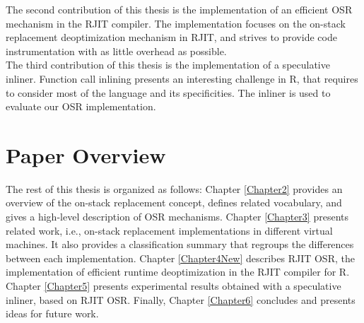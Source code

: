 The second contribution of this thesis is the implementation of an efficient OSR mechanism in the RJIT compiler. The implementation focuses on the on-stack replacement deoptimization mechanism in RJIT, and strives to provide code instrumentation with as little overhead as possible.\\

The third contribution of this thesis is the implementation of a speculative inliner. Function call inlining presents an interesting challenge in R, that requires to consider most of the language and its specificities. The inliner is used to evaluate our OSR implementation.\\

\section{Paper Overview}

The rest of this thesis is organized as follows: Chapter \ref{Chapter2} provides an overview of the on-stack replacement concept, defines related vocabulary, and gives a high-level description of OSR mechanisms.
Chapter \ref{Chapter3} presents related work, i.e., on-stack replacement implementations in different virtual machines. It also provides a classification summary that regroups the differences between each implementation.
Chapter \ref{Chapter4New} describes RJIT OSR, the implementation of efficient runtime deoptimization in the RJIT compiler for R.
Chapter \ref{Chapter5} presents experimental results obtained with a speculative inliner, based on RJIT OSR.
Finally, Chapter \ref{Chapter6} concludes and presents ideas for future work.\\ 





